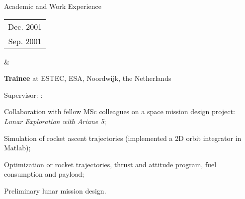 \documentclass[a4paper,12pt]{article}
\newcommand{\dynhref}[2]{%
  \iftoggle{expliciturl}{%
    #2 \footnote{\href{http://#1}{\detokenize{#1}}}%
  }{%
    \href{http://#1}{#2}%
  }%
}
\newcommand{\teachingcv}[2]{\iftoggle{teaching}{#1}{#2}}
\begin{document}
\begin{cvsection}{Academic and Work Experience}
\begin{tabular}{c}
Dec. 2001 \\
Sep. 2001 \\ 
\end{tabular} 
&
  \begin{itti}
    \item \textbf{Trainee} at \acf{ESTEC}, \ac{ESA}, Noordwijk, the Netherlands
    \item Supervisor: \dynhref{en.wikipedia.org/wiki/Wubbo_Ockels}{Prof. Wubbo Ockels}:
    \begin{ittib}
      \item Collaboration with fellow MSc colleagues on a space mission design project: \emph{Lunar Exploration with Ariane 5};
      \item Simulation of rocket ascent trajectories (implemented a 2D orbit integrator in Matlab);
      \item Optimization or rocket trajectories, thrust and attitude program, fuel consumption and payload;
      \item Preliminary lunar mission design.
    \end{ittib}
  \end{itti}\\

\end{cvsection}

\teachingcv{
\begin{cvtext}{Teaching Experience}

At TU Delft, I was required to supervise student projects of a practical nature, every year.
This means that I had to direct the work of a small group of students (7 to 9) to a particular objective.
It is an activity I enjoy doing and I see the students are enthusiastic about.
I always ask them to fill (anonymously) a short list of questions regarding their opinion of the project and my ability as instructor (these answer sheets are available if requested).
I always get encouraging and positive feedback.

My senior colleagues always grade my teaching activities as very good to excellent and I am often asked by students to support their application with recommendation letters.

In what concerns teaching large groups of students, I have given lectures to classes of about 30 students, on exceptional occasions, at the request of colleagues.

Additionally, I was a lecturer at the 2017 Summer School On Data Assimilation And Its Applications In Oceanography, Hydrology, Risk \& Safety And Reservoir Engineering (cf. \dynhref{data-assimilation.com}{data-assimilation.com}).

I value all teaching my experiences because they were extremely rewarding.

\end{cvtext}
}{}
\end{document}
